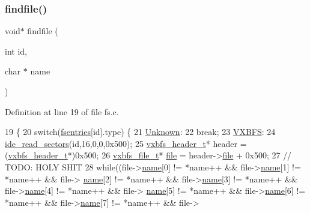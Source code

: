 \subsubsection{\texorpdfstring{findfile()}{findfile()}}
{\footnotesize\ttfamily void$\ast$ findfile (\begin{DoxyParamCaption}\item[{int}]{id,  }\item[{char $\ast$}]{name }\end{DoxyParamCaption})}



Definition at line 19 of file fs.\+c.


\begin{DoxyCode}
19                                    \{
20     \textcolor{keywordflow}{switch}(\hyperlink{a00152_a6b46131164b26e476762930c9aae4319_a6b46131164b26e476762930c9aae4319}{fsentries}[\textcolor{keywordtype}{id}].type) \{
21         \hyperlink{a00161_a2e9d0c3765a28910638672bfc746181b_a2e9d0c3765a28910638672bfc746181ba4e81c184ac3ad48a389cd4454c4a05bb}{Unknown}:
22             \textcolor{keywordflow}{break};
23         \hyperlink{a00161_a2e9d0c3765a28910638672bfc746181b_a2e9d0c3765a28910638672bfc746181bac740d3121d634c0d77f5602b1fdab236}{VXBFS}:
24             \hyperlink{a00032_a9dd84843412753d236e17a15277c5b98_a9dd84843412753d236e17a15277c5b98}{ide\_read\_sectors}(\textcolor{keywordtype}{id},16,0,0,0x500);
25             \hyperlink{a00340}{vxbfs\_header\_t}* header = (\hyperlink{a00340}{vxbfs\_header\_t}*)0x500;
26             \hyperlink{a00336}{vxbfs\_file\_t}* \hyperlink{a00308}{file} = header->\hyperlink{a00340_a3b903de5c5034494530cdc0c2d4ff9b1_a3b903de5c5034494530cdc0c2d4ff9b1}{file} + 0x500;
27             \textcolor{comment}{// TODO: HOLY SHIT}
28             \textcolor{keywordflow}{while}((file->\hyperlink{a00336_a07ecc9bacdc2943442f26f62f6749055_a07ecc9bacdc2943442f26f62f6749055}{name}[0] != *name++ && file->\hyperlink{a00336_a07ecc9bacdc2943442f26f62f6749055_a07ecc9bacdc2943442f26f62f6749055}{name}[1] != *name++ && file->
      \hyperlink{a00336_a07ecc9bacdc2943442f26f62f6749055_a07ecc9bacdc2943442f26f62f6749055}{name}[2] != *name++ && file->\hyperlink{a00336_a07ecc9bacdc2943442f26f62f6749055_a07ecc9bacdc2943442f26f62f6749055}{name}[3] != *name++ && file->\hyperlink{a00336_a07ecc9bacdc2943442f26f62f6749055_a07ecc9bacdc2943442f26f62f6749055}{name}[4] != *name++ && file->
      \hyperlink{a00336_a07ecc9bacdc2943442f26f62f6749055_a07ecc9bacdc2943442f26f62f6749055}{name}[5] != *name++ && file->\hyperlink{a00336_a07ecc9bacdc2943442f26f62f6749055_a07ecc9bacdc2943442f26f62f6749055}{name}[6] != *name++ && file->\hyperlink{a00336_a07ecc9bacdc2943442f26f62f6749055_a07ecc9bacdc2943442f26f62f6749055}{name}[7] != *name++ && file->

\end{DoxyCode}
